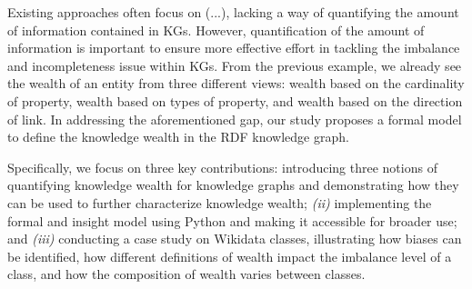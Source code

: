 

Existing approaches often focus on (...), lacking a way of quantifying the amount of information contained in KGs. However, quantification of the amount of information is important to ensure more effective effort in tackling the imbalance and incompleteness issue within KGs. From the previous example, we already see the wealth of an entity from three different views: wealth based on the cardinality of property, wealth based on types of property, and wealth based on the direction of link. In addressing the aforementioned gap, our study proposes a formal model to define the knowledge wealth in the RDF knowledge graph.

Specifically, we focus on three key contributions:  introducing three notions of quantifying knowledge wealth for knowledge graphs and demonstrating how they can be used to further characterize knowledge wealth; \textit{(ii)} implementing the formal and insight model using Python and making it accessible for broader use; and \textit{(iii)} conducting a case study on Wikidata classes, illustrating how biases can be identified, how different definitions of wealth impact the imbalance level of a class, and how the composition of wealth varies between classes.

